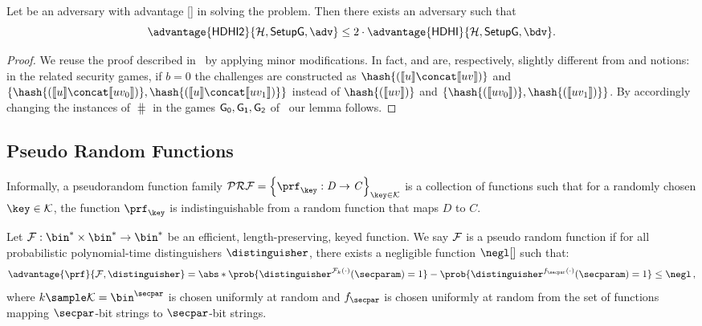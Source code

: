 \begin{lemma}\label{preliminaries:lemma:hdhi_hdhii}
    Let \adv{} be an adversary with advantage \advantage{\hdhii}{\hashSet, \groupSetup, \adv}[] in solving the \hdhii{} problem. Then there exists an adversary \bdv{} such that
    \[
        \advantage{\hdhii}{\hashSet, \groupSetup{}, \adv} \leq 2 \cdot \advantage{\hdhi}{\hashSet, \groupSetup{}, \bdv}.
    \]
\end{lemma}
\begin{proof}
    We reuse the proof described in~\cite[Lemma 6.1]{abdalla2010robust} by applying minor modifications. In fact, \hdhi{} and \hdhii{} are, respectively, slightly different from \odh{} and \odhii{} notions: in the related security games, if $b=0$ the challenges are constructed as $\hash{(\groupenc{u} \concat \groupenc{uv})}$ and $\{\hash{(\groupenc{u} \concat \groupenc{uv_0})}, \hash{(\groupenc{u} \concat \groupenc{uv_1})}\}$ instead of $\hash{(\groupenc{uv})}$ and $\{\hash{(\groupenc{uv_0})}, \hash{(\groupenc{uv_1})}\}$. By accordingly changing the instances of $\hash{}$ in the games $\mathsf{G_0},\mathsf{G_1}, \mathsf{G_2}$ of~\cite[Lemma 6.1]{abdalla2010robust} our lemma follows.
\end{proof}

\subsection{Pseudo Random Functions}\label{preliminaries:definitions:prfs}

Informally, a pseudorandom function family $\prfSet = \indexedset{\prf_{\key}: \mathit{D} \to \mathit{C}}{\key \in \keyspace}$ is a collection of functions such that for a randomly chosen $\key \in \keyspace$, the function $\prf_{\key}$ is indistinguishable from a random function that maps $\mathit{D}$ to $\mathit{C}$.

\begin{definition}
Let $\funcSet: \bin^* \times \bin^* \to \bin^*$ be an efficient, length-preserving, keyed function. We say $\mathcal{F}$ is a pseudo random function if for all probabilistic polynomial-time distinguishers $\distinguisher$, there exists a negligible function $\negl[]$ such that:
\[
	\advantage{\prf}{\funcSet, \distinguisher} = \abs*{\prob{ \distinguisher^{\funcSet_k(\cdot)}(\secparam)=1 } - \prob{ \distinguisher^{f_\secpar(\cdot)}(\secparam)=1 }} \leq \negl\,,
\]
where $k \sample \keyspace = \bin^\secpar$ is chosen uniformly at random and $f_\secpar$ is chosen uniformly at random from the set of functions mapping $\secpar$-bit strings to $\secpar$-bit strings.
\end{definition}

